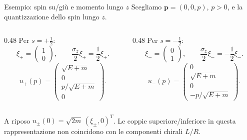 \begin{frame}{Esempio: spin su/giù e momento lungo $z$}
\small
Scegliamo $\mathbf p=(0,0,p)$, $p>0$, e la quantizzazione dello spin lungo $z$.
\begin{columns}[T,onlytextwidth]
\begin{column}{0.48\textwidth}
Per $s=+\frac12$:
\[
 \xi_+=\begin{pmatrix}1\\0\end{pmatrix},\qquad
 \frac{\sigma_z}{2}\xi_+=\frac12\xi_+.
\]
\[
 u_+(p)=
 \begin{pmatrix}
 \sqrt{E+m}\\0\\[1pt]
 p/\sqrt{E+m}\\0
 \end{pmatrix}.
\]
\end{column}
\begin{column}{0.48\textwidth}
Per $s=-\frac12$:
\[
 \xi_-=\begin{pmatrix}0\\1\end{pmatrix},\qquad
 \frac{\sigma_z}{2}\xi_-=-\frac12\xi_-.
\]
\[
 u_-(p)=
 \begin{pmatrix}
 0\\\sqrt{E+m}\\[1pt]
 0\\-p/\sqrt{E+m}
 \end{pmatrix}.
\]
\end{column}
\end{columns}
\medskip
A riposo $u_\pm(0)=\sqrt{2m}\,(\xi_\pm,0)^T$.
Le coppie superiore/inferiore in questa rappresentazione
non coincidono con le componenti chirali $L/R$.
\end{frame}


